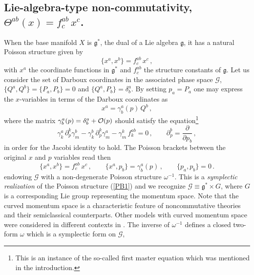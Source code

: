 \documentclass[12pt,a4paper]{article}
\numberwithin{equation}{section}
\theoremstyle{definition}
\begin{document}
\subsection{Lie-algebra-type non-commutativity, \texorpdfstring{$\Theta^{ab}(x)=f^{ab}_c\,x^c$.}{}}\label{sec_1-2}
 When the base manifold $X$ is $\mathfrak{g}^\ast$, the dual of a Lie algebra $\mathfrak{g}$, it has a natural Poisson structure given by 
\begin{equation}\label{PB1}
\{x^a,x^b\}=f^{ab}_c\,x^c\,,
\end{equation}
with $x^a$ the coordinate functions in $\mathfrak{g}^\ast$ and  $f^{ab}_c$ the structure constants of $\mathfrak{g}$.
 Let us consider the set of  Darboux coordinates in {the associated phase space $\mathcal{G}$}, $\{Q^a,Q^b\}=\{P_a,P_b\}=0$ and $\{Q^a,P_b\}=\delta^a_b$. By setting $p_a=P_a$ one may express the $x$-variables in terms of the Darboux coordinates as %
\begin{equation}
x^a=\gamma^a_b(p)\,Q^b\,,
\end{equation}
where the matrix $\gamma^a_b(p)=\delta^a_b+{\cal O}(p)$ should satisfy the equation\footnote{This is an instance of the so-called first master equation which was mentioned in the introduction.}
\begin{equation}\label{eqgamma}
 \gamma^a_k\,\partial^k_p\gamma_m^b-\gamma^b_k\,\partial^k_p\gamma^a_m-\gamma^k_m\,f_k^{ab}=0\,,\qquad \partial_p^b=\frac{\partial}{\partial p_b}\,,
\end{equation}
in order for the Jacobi identity to hold. %
The Poisson brackets between the original $x$ and $p$ variables read then
\begin{equation}\label{sr}
\{x^a,x^b\}=f^{ab}_c\,x^c\,,\qquad \{x^a,p_b\}=\gamma^a_b(p)\,,\qquad \{p_a,p_b\}=0\,.
\end{equation}
endowing   $\mathcal{G}$ with a non-degenerate Poisson structure $\omega^{-1}$. 
This is  a {\it symplectic realization} of the Poisson structure (\ref{PB1}) {and we recognize $\mathcal{G}\equiv\mathfrak{g}^*\times G$}, where $G$ is a corresponding Lie group representing the momentum space. Note that the curved momentum space is a characteristic feature of noncommutative theories and their semiclassical counterparts. Other models with curved momentum space were considered in different contexts in \cite{Freidel:2005me,Amelino-Camelia:2011lvm,Kowalski-Glikman:2013rxa,Guedes:2013vi,Smilga:2022xij,Franchino-Vinas:2023rcc}. The inverse of $\omega^{-1}$ defines a closed two-form $\omega$ which is a symplectic form on $\mathcal{G}$,
\end{document}
